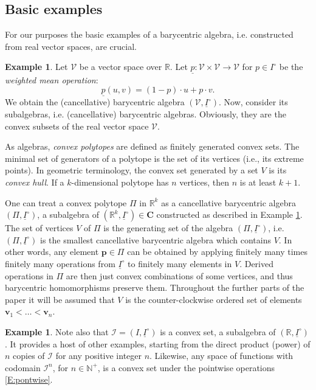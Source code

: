 \documentclass[12pt]{amsart}
\theoremstyle{plain}
\theoremstyle{definition}
\newtheorem{example}[theorem]{Example}
\numberwithin{equation}{section}
\begin{document}
\subsection{Basic examples}

For our purposes the basic examples of a bary\-centric algebra, i.e. constructed from real vector spaces, are crucial.

\begin{example}\label{Ex:VectSpace}
Let $\mathcal{V}$ be a vector space over $\mathbb{R}$. Let $\underline{p}\colon \mathcal{V}\times \mathcal{V}\rightarrow \mathcal{V}$ for $p\in I^{\circ}$ be the \emph{weighted mean operation}:
\begin{equation}
\underline{p}(u,v)=(1-p)\cdot u+p\cdot v.
\end{equation}
We obtain the (cancellative) barycentric algebra $(\mathcal{V},\underline{I}^{\circ})$. Now, consider its subalgebras, i.e. (cancellative) barycentric algebras. Obviously, they are the convex subsets of the real vector space $\mathcal{V}$.
\end{example}

As algebras, \emph{convex polytopes} are defined as finitely generated convex sets. The minimal set of generators of a polytope is the set of its vertices (i.e., its extreme points). In geometric terminology, the convex set generated by a set $V$ is its \emph{convex hull}. If a $k$-dimensional polytope has $n$ vertices, then $n$ is at least $k+1$.

One can treat a convex polytope $\Pi$ in $\mathbb{R}^k$ as a cancellative barycentric algebra $(\Pi,\underline{I}^{\circ})$, a subalgebra of $(\mathbb{R}^k,\underline{I}^{\circ})\in\mathbf{C}$ constructed as described in Example \ref{Ex:VectSpace}. The set of vertices $V$ of $\Pi$ is the generating set of the algebra $(\Pi,\underline{I}^{\circ})$, i.e. $(\Pi,\underline{I}^{\circ})$ is the smallest cancellative barycentric algebra which contains $V$. In other words, any element $\mathbf{p}\in\Pi$ can be obtained by applying finitely many times finitely many operations from $\underline{I}^{\circ}$ to finitely many elements in $V$. Derived operations in $\Pi$ are then just convex combinations of some vertices, and thus barycentric homomorphisms preserve them. Throughout the further parts of the paper it will be assumed that $V$ is the counter-clockwise ordered set of elements $\mathbf v_1 <\dots <\mathbf v_n$.

\begin{example}
Note also that $\mathcal{I}=(I,\underline{I}^{\circ})$ is a convex set, a subalgebra of $(\mathbb{R},\underline{I}^{\circ})$. It provides a host of other examples, starting from the direct product (power) of $n$ copies of $\mathcal{I}$ for any positive integer $n$. Likewise, any space of functions with codomain $\mathcal{I}^n$, for $n\in\mathbb{N}^+$, is a convex set under the pointwise operations \eqref{E:pontwise}.
\end{example}
\end{document}
